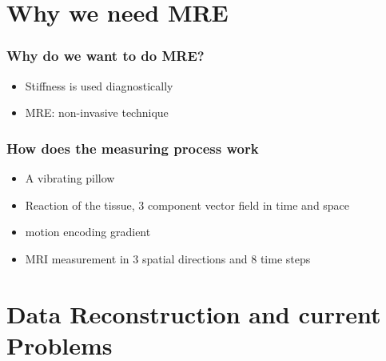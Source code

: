 

\section{Why we need MRE}

% 


\begin{frame}		\frametitle{Why do we want to do MRE?}

\begin{itemize}
 \item Stiffness is used diagnostically
 \item MRE: non-invasive technique
\end{itemize}

\end{frame}


\begin{frame}		\frametitle{How does the measuring process work}

\begin{itemize}
 \item A vibrating pillow
 \item Reaction of the tissue, 3 component vector field in time and space
 \item motion encoding gradient
 \item MRI measurement in 3 spatial directions and 8 time steps
\end{itemize}

\end{frame}

\section{Data Reconstruction and current Problems}


